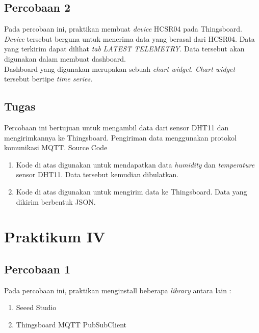\documentclass{class}
\begin{document}
    \subsection{Percobaan 2}
    Pada percobaan ini, praktikan membuat \emph{device} HCSR04 pada Thingsboard.
    \emph{Device} tersebut berguna untuk menerima data yang berasal dari HCSR04. 
    Data yang terkirim dapat dilihat \emph{tab} \emph{LATEST TELEMETRY}.
    Data tersebut akan digunakan dalam membuat dashboard. \\
    Dashboard yang digunakan merupakan sebuah \emph{chart widget}.
    \emph{Chart widget} tersebut bertipe \emph{time series}.
    \subsection{Tugas}
    Percobaan ini bertujuan untuk mengambil data dari sensor DHT11 dan mengirimkannya ke Thingsboard. 
    Pengiriman data menggunakan protokol komunikasi MQTT. 
    Source Code
    \begin{enumerate}
      \item 
      Kode di atas digunakan untuk mendapatkan data \emph{humidity} dan \emph{temperature} sensor DHT11.
      Data tersebut kemudian dibulatkan.
      \item 
      Kode di atas digunakan untuk mengirim data ke Thingsboard.
      Data yang dikirim berbentuk JSON. \\
    \end{enumerate}
  \section{Praktikum IV}
  \subsection{Percobaan 1}
  Pada percobaan ini, praktikan menginstall beberapa \emph{library} antara lain :
  \begin{enumerate}
    \item Seeed Studio
    \item Thingsboard MQTT PubSubClient
  \end{enumerate}
\end{document}
